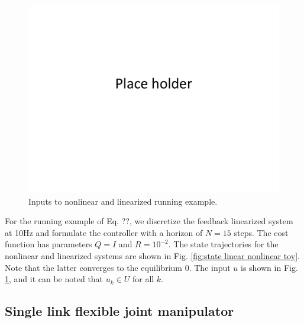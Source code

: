 \begin{figure}
	\centering	
	\includegraphics[scale=0.2]{figs/placeHolder.pdf}
	\caption{Inputs to nonlinear and linearized running example.}
	\label{fig:input toy}
\end{figure}
For the running example of Eq. ??, we discretize the feedback linearized system at 10Hz and formulate the controller with a horizon of $N=15$ steps. 
The cost function has parameters $Q=I$ and $R=10^{-2}$.
The state trajectories for the nonlinear and linearized systems are shown in Fig. \ref{fig:state linear nonlinear toy}.
Note that the latter converges to the equilibrium 0. 
The input $u$ is shown in Fig. \ref{fig:input toy}, and it can be noted that $u_k \in U$ for all $k$.

\subsection{Single link flexible joint manipulator}
\label{sec:manipulator}


